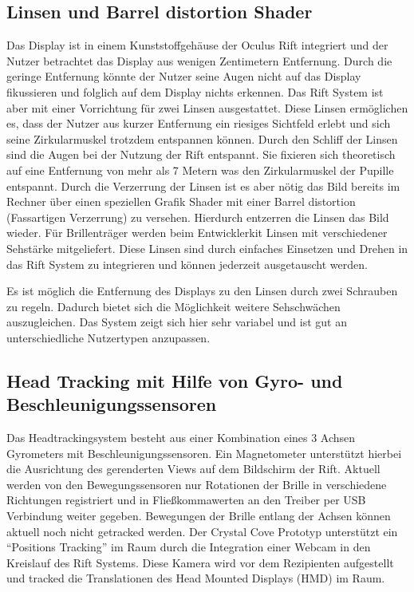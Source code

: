 \documentclass[pagesize, paper=a4, fontsize=12pt,titlepage=true, headings=small, headnosepline, abstractoff, liststotoc, nochapterprefix, plainheadsepline, twoside]{scrreprt}
\begin{document}
\subsection{Linsen und Barrel distortion Shader}
Das Display ist in einem Kunststoffgehäuse der Oculus Rift integriert und der Nutzer betrachtet das Display aus wenigen Zentimetern Entfernung. Durch die geringe Entfernung könnte der Nutzer seine Augen nicht auf das Display fikussieren und folglich auf dem Display nichts erkennen. Das Rift System ist aber mit einer Vorrichtung für zwei Linsen ausgestattet. Diese Linsen ermöglichen es, dass der Nutzer aus kurzer Entfernung ein riesiges Sichtfeld erlebt und sich seine Zirkularmuskel trotzdem entspannen können. Durch den Schliff der Linsen sind die Augen bei der Nutzung der Rift entspannt. Sie fixieren sich theoretisch auf eine Entfernung von mehr als 7 Metern was den Zirkularmuskel der Pupille entspannt. Durch die Verzerrung der Linsen ist es aber nötig das Bild bereits im Rechner über einen speziellen Grafik Shader mit einer Barrel distortion (Fassartigen Verzerrung) zu versehen. Hierdurch entzerren die Linsen das Bild wieder. Für Brillenträger werden beim Entwicklerkit Linsen mit verschiedener Sehstärke mitgeliefert. Diese Linsen sind durch einfaches Einsetzen und Drehen in das Rift System zu integrieren und können jederzeit ausgetauscht werden.

Es ist möglich die Entfernung des Displays zu den Linsen durch zwei Schrauben zu regeln. Dadurch bietet sich die Möglichkeit weitere Sehschwächen auszugleichen. Das System zeigt sich hier sehr variabel und ist gut an unterschiedliche Nutzertypen anzupassen.

\subsection{Head Tracking mit Hilfe von Gyro- und Beschleunigungssensoren}
Das Headtrackingsystem besteht aus einer Kombination eines 3 Achsen Gyrometers mit Beschleunigungssensoren. Ein Magnetometer unterstützt hierbei die Ausrichtung des gerenderten Views auf dem Bildschirm der Rift. Aktuell werden von den Bewegungssensoren nur Rotationen der Brille in verschiedene Richtungen registriert und in Fließkommawerten an den Treiber per USB Verbindung weiter gegeben. Bewegungen der Brille entlang der Achsen können aktuell noch nicht getracked werden. Der Crystal Cove Prototyp unterstützt ein "`Positions Tracking"' im Raum durch die Integration einer Webcam in den Kreislauf des Rift Systems. Diese Kamera wird vor dem Rezipienten aufgestellt und tracked die Translationen des Head Mounted Displays (HMD) im Raum.
\\
\end{document}
